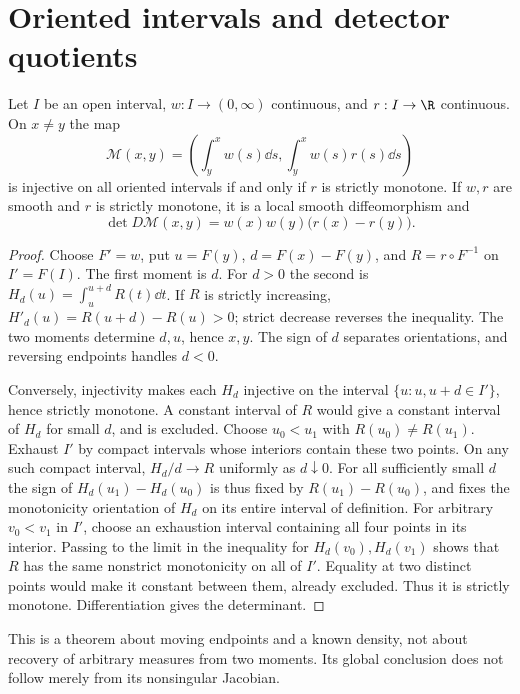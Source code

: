 \section{Oriented intervals and detector quotients}
\label{sec:v83-interval}
\begin{lemma}\label{lem:v83-interval}
Let $I$ be an open interval, $w:I\to(0,\infty)$ continuous, and
$r:I\to\R$ continuous. On $x\ne y$ the map
\[
 \mathcal M(x,y)=\left(\int_y^xw(s)\dd s,
                         \int_y^xw(s)r(s)\dd s\right)
\]
is injective on all oriented intervals if and only if $r$ is strictly
monotone. If $w,r$ are smooth and $r$ is strictly monotone, it is a local
smooth diffeomorphism and
\begin{equation}\label{eq:v83-moment-jacobian}
 \det D\mathcal M(x,y)=w(x)w(y)\bigl(r(x)-r(y)\bigr).
\end{equation}
\end{lemma}
\begin{proof}
Choose $F'=w$, put $u=F(y)$, $d=F(x)-F(y)$, and $R=r\circ F^{-1}$
on $I'=F(I)$. The first moment is $d$. For $d>0$ the second is
$H_d(u)=\int_u^{u+d}R(t)\dd t$. If $R$ is strictly increasing,
$H'_d(u)=R(u+d)-R(u)>0$; strict decrease reverses the inequality.
The two moments determine $d,u$, hence $x,y$. The sign of $d$ separates
orientations, and reversing endpoints handles $d<0$.

Conversely, injectivity makes each $H_d$ injective on the interval
$\{u:u,u+d\in I'\}$, hence strictly monotone. A constant interval of
$R$ would give a constant interval of $H_d$ for small $d$, and is
excluded. Choose $u_0<u_1$ with $R(u_0)\ne R(u_1)$. Exhaust $I'$ by
compact intervals whose interiors contain these two points. On any
such compact interval, $H_d/d\to R$ uniformly as $d\downarrow0$.
For all sufficiently small $d$ the sign of
$H_d(u_1)-H_d(u_0)$ is thus fixed by $R(u_1)-R(u_0)$, and fixes the
monotonicity orientation of $H_d$ on its entire interval of definition.
For arbitrary $v_0<v_1$ in $I'$, choose an exhaustion interval containing
all four points in its interior. Passing to the limit in the inequality
for $H_d(v_0),H_d(v_1)$ shows that $R$ has the same nonstrict
monotonicity on all of $I'$. Equality at two distinct points would make
it constant between them, already excluded. Thus it is strictly
monotone. Differentiation gives the determinant.
\end{proof}
This is a theorem about moving endpoints and a known density, not
about recovery of arbitrary measures from two moments. Its global
conclusion does not follow merely from its nonsingular Jacobian.

